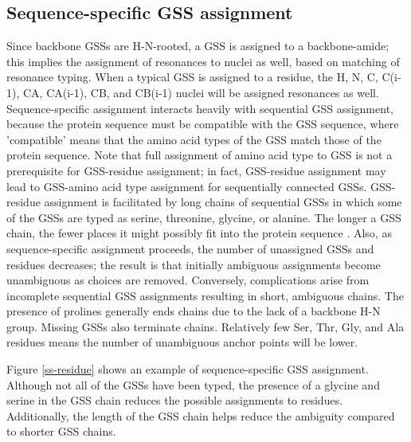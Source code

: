 \subsection*{Sequence-specific GSS assignment}
Since backbone GSSs are H-N-rooted, a GSS is assigned to a 
backbone-amide; this implies the assignment of resonances to nuclei as well, 
based on matching of resonance typing.  When a typical GSS is assigned to a residue, 
the H, N, C, C(i-1), CA, CA(i-1), CB, and CB(i-1) nuclei will be assigned 
resonances as well.  Sequence-specific assignment interacts heavily with 
sequential GSS assignment, because the protein sequence must be compatible 
with the GSS sequence, where 'compatible' means that the amino acid types 
of the GSS match those of the protein sequence.  Note that full assignment 
of amino acid type to GSS is not a prerequisite for GSS-residue assignment; 
in fact, GSS-residue assignment may lead to GSS-amino acid type assignment 
for sequentially connected GSSs.  GSS-residue assignment is facilitated by 
long chains of sequential GSSs in which some of the GSSs are typed as serine, 
threonine, glycine, or alanine.  The longer a GSS chain, the fewer places it 
might possibly fit into the protein sequence \cite{saga}.  Also, 
as sequence-specific assignment proceeds, the number of unassigned GSSs and 
residues decreases; the result is that initially ambiguous assignments become 
unambiguous as choices are removed.  Conversely, complications arise from 
incomplete sequential GSS assignments resulting in short, ambiguous chains.  
The presence of prolines generally ends chains due to the lack of a backbone 
H-N group.  Missing GSSs also terminate chains.  Relatively few Ser, Thr, Gly, 
and Ala residues means the number of unambiguous anchor points will be lower.

Figure \ref{ss-residue} shows an example of sequence-specific GSS assignment.
Although not all of the GSSs have been typed, the presence of a glycine and
serine in the GSS chain reduces the possible assignments to residues.
Additionally, the length of the GSS chain helps reduce the ambiguity compared
to shorter GSS chains.

